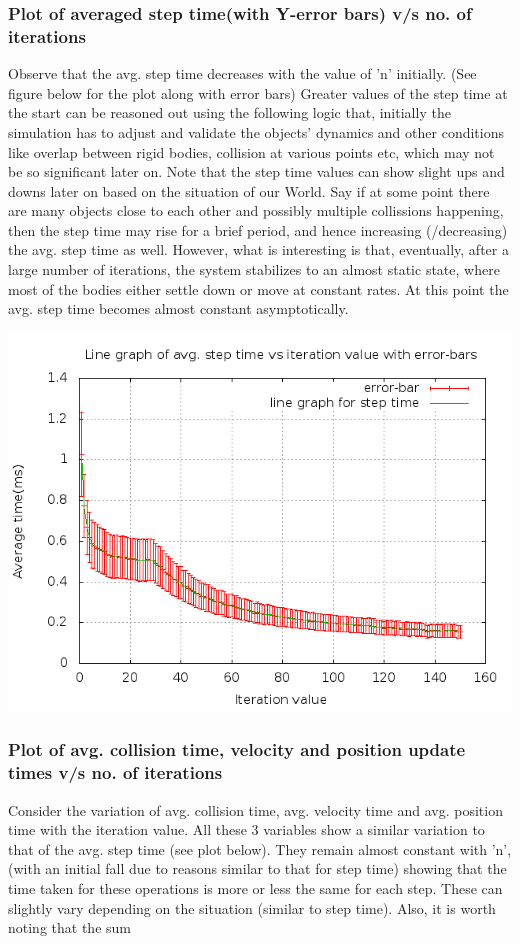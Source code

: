 \documentclass[11pt]{article}
\begin{document}
\subsubsection{Plot of averaged step time(with Y-error bars) v/s no. of iterations}
Observe that the avg. step time decreases with the value of 'n' initially. (See figure below for the plot along with error bars) Greater values of the step time at the start can be reasoned out using the following logic that, initially the simulation has to adjust and validate the objects' dynamics and other conditions like overlap between rigid bodies, collision at various points etc, which may not be so significant later on. Note that the step time values can show slight ups and downs later on based on the situation of our World. Say if at some point there are many objects close to each other and possibly multiple collissions happening, then the step time may rise for a brief period, and hence increasing (/decreasing) the avg. step time as well. However, what is interesting is that, eventually, after a large number of iterations, the system stabilizes to an almost static state, where most of the bodies either settle down or move at constant rates. At this point the avg. step time becomes almost constant asymptotically.

\begin{center} 
\includegraphics [scale=0.45]{./images/g29_plot03.png} 
\end{center}

\subsubsection{Plot of avg. collision time, velocity and position update times v/s no. of iterations}
Consider the variation of avg. collision time, avg. velocity time and avg. position time with the iteration value. All these 3 variables show a similar variation to that of the avg. step time (see plot below). They remain almost constant with 'n', (with an initial fall due to reasons similar to that for step time) showing that the time taken for these operations is more or less the same for each step. These can slightly vary depending on the situation (similar to step time). Also, it is worth noting that the sum
\end{document}
